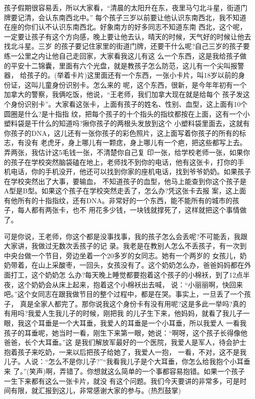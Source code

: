 \documentclass[11pt,a4paper,onecolumn]{article}
\begin{document}
孩子假期很容易丢，所以大家看，``清晨的太阳升在东，夜里马勺北斗星，街道门牌要记清，会认东南西北中。''
每个孩子三岁以前要让他认识东南西北，我不知道在座的你们认不认识东南西北。好象南方的好多同志不知道东南
西北，这个呢，一定要让孩子有这个方向感，晚上要让他去认，晴天的时候，天气好的时候让他去找北斗星。三岁
的孩子要记住家里的街道门牌，还要干什么呢?自己三岁的孩子要练一公里之内让他自己走回家，大家看我这儿有这
么一个东西，这是我给孩子做的平安十二锦囊，里面有六个光盘，就是教孩子怎么防范，这儿有一个尖叫报警器，
给孩子的。(举着卡片)这里面还有一个东西，一张小卡片，叫18岁以前的身份证，这叫儿童身份识别卡。怎么来的
呢，这个东西，很新，是今年年初有一个加拿大的警察，我俩吃饭，他说，``王老师，我们加拿大现在就是给每个
孩子发这个身份识别卡''。大家看这张卡，上面有孩子的姓名、性别、血型，这上面有10个圆圈是什么?是十指指
纹，把每个孩子的十个指头的指纹都按在上面，这有一个小塑料袋是干什么的知道吗?揪你孩子的两根头发放到这个
小塑料袋里面去，这就有你孩子的DNA，这儿还有一张你孩子的彩色照片，这上面写着你孩子的所有的标志，有没有
老虎牙，身上哪儿有一颗痣，身上哪儿有一个疤，把这些都写上去。弄两张，我估计这5毛钱一张，不清楚你自己复
印一张，给学校老师一张，如果你的孩子在学校突然脑袋磕在地上，老师找不到你的电话，他有这张卡，打你的手
机电话，你的手机没开，他还可以找到你家的座机电话，找到爷爷奶奶。如果孩子在学校突然出了大事，要输血，
不知道孩子的血型，他马上能查到你这个孩子是A型是B型。如果这个孩子在学校突然走丢了，怎么办?凭这张卡去报
案，这上面有他所有的十指指纹，还有DNA。非常好的一个东西，能不能所有的城市的孩子，每人都有两张卡，也不
用花多少钱，一块钱就撑死了，这样就把这个事情做了。

可是你说，王老师，你这个都是没事找事，我的孩子怎么会丢呢?不可能丢，我跟大家讲，我做过无数次丢孩子的记
录。我老是在教别人怎么不丢孩子，有一次到中央台做一个节目，旁边坐着一个20多岁的女同志。她有一个两岁的
女孩儿，奶奶带着，在山上采酸枣，一回头，女孩没有了。这个奶奶怎么办，爸爸妈妈都在外面打工，这个奶奶怎
么办?每天晚上睡觉都要抱着这个孩子的小棉袄，到了12点半夜，这个奶奶会从床上起来，抱着这个小棉袄出去喊，
说：``小丽丽啊，快回来吧。''这个女同志在跟我做节目的整个过程中，都是在哭。事实上，一旦丢了一个孩子，
真是全家人都完了。那你说我这个身份卡有没有用呢?这是多此一举吗?真的有用吗?我爱人生我儿子的时候，刚把我
的儿子生下来，他妈妈，就看了我儿子一眼，我这个耳垂是一个大耳垂，我爱人的耳垂是一个小耳垂，所以我爱人
一看我孩子的耳垂呢，她当时一看，刚生下来第一眼，她说：``啊呀，这个孩子长得像他爸爸，长个大耳垂。''这
是我们解放军最好的一个医院，我爱人是军人，待会护士抱着孩子来吃奶，一来以后把孩子给她了，我爱人一抱，
一看，不对，这不是我儿子。人说：``怎么不是你儿子?''``我看我儿子是个大耳垂，你怎么给我抱个小耳垂来
了。''(笑声)啊，弄错了。你想就这么简单的一个事都容易抱错。如果一个孩子一生下来都有这么一张卡片，就没
有这个问题。我们今天要讲的非常多，可是时间有限，就汇报到这儿，非常感谢大家的参与。(热烈鼓掌)
\end{document}
